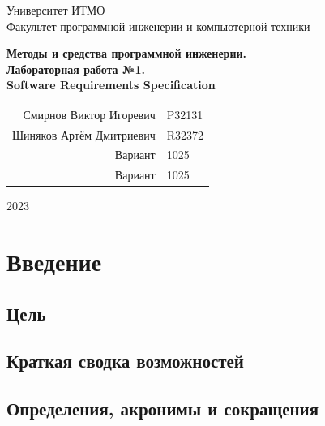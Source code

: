 \documentclass{article}
\begin{document}
\begin{titlepage}
  \begin{center}
    \begin{spacing}{1.4}
      \large{Университет ИТМО} \\
      \large{Факультет программной инженерии и компьютерной техники} \\
    \end{spacing}
    \vfill
    \textbf{
      \huge{Методы и средства программной инженерии.} \\
      \huge{Лабораторная работа №1.} \\
      \huge{Software Requirements Specification} \\
    }
  \end{center}
  \vfill
  \begin{center}
    \begin{tabular}{r l}
      Смирнов Виктор Игоревич  & P32131 \\
      Шиняков Артём Дмитриевич & R32372 \\
      Вариант                  & 1025   \\
      Вариант                  & 1025   \\
    \end{tabular}
  \end{center}
  \vfill
  \begin{center}
    \begin{large}
      2023
    \end{large}
  \end{center}
\end{titlepage}

\tableofcontents

\section{Введение}

\subsection{Цель}


\subsection{Краткая сводка возможностей}


\subsection{Определения, акронимы и сокращения}

\end{document}
